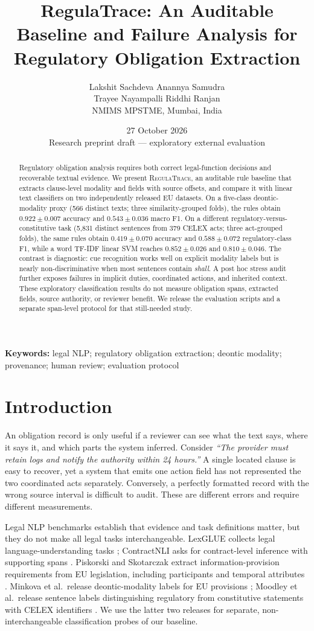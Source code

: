 \documentclass[11pt,a4paper]{article}
\title{\bfseries RegulaTrace: An Auditable Baseline and Failure Analysis for Regulatory Obligation Extraction}
\author{Lakshit Sachdeva \quad Anannya Samudra\\
Trayee Nayampalli \quad Riddhi Ranjan\\[0.35em]
\small NMIMS MPSTME, Mumbai, India}
\date{27 October 2026\\[0.25em]\small Research preprint draft --- exploratory external evaluation}
\newcommand{\system}{\textsc{RegulaTrace}}
\begin{document}
\maketitle
\begin{abstract}
Regulatory obligation analysis requires both correct legal-function decisions and recoverable textual evidence. We present \system, an auditable rule baseline that extracts clause-level modality and fields with source offsets, and compare it with linear text classifiers on two independently released EU datasets. On a five-class deontic-modality proxy (566 distinct texts; three similarity-grouped folds), the rules obtain $0.922\pm0.007$ accuracy and $0.543\pm0.036$ macro F1. On a different regulatory-versus-constitutive task (5,831 distinct sentences from 379 CELEX acts; three act-grouped folds), the same rules obtain $0.419\pm0.070$ accuracy and $0.588\pm0.072$ regulatory-class F1, while a word TF-IDF linear SVM reaches $0.852\pm0.026$ and $0.810\pm0.046$. The contrast is diagnostic: cue recognition works well on explicit modality labels but is nearly non-discriminative when most sentences contain \emph{shall}. A post hoc stress audit further exposes failures in implicit duties, coordinated actions, and inherited context. These exploratory classification results do not measure obligation spans, extracted fields, source authority, or reviewer benefit. We release the evaluation scripts and a separate span-level protocol for that still-needed study.
\end{abstract}
\noindent\textbf{Keywords:} legal NLP; regulatory obligation extraction; deontic modality; provenance; human review; evaluation protocol

\section{Introduction}
An obligation record is only useful if a reviewer can see what the text says, where it says it, and which parts the system inferred. Consider \emph{``The provider must retain logs and notify the authority within 24 hours.''} A single located clause is easy to recover, yet a system that emits one action field has not represented the two coordinated acts separately. Conversely, a perfectly formatted record with the wrong source interval is difficult to audit. These are different errors and require different measurements.

Legal NLP benchmarks establish that evidence and task definitions matter, but they do not make all legal tasks interchangeable. LexGLUE collects legal language-understanding tasks \cite{lexglue}; ContractNLI asks for contract-level inference with supporting spans \cite{contractnli}. Piskorski and Skotarczak extract information-provision requirements from EU legislation, including participants and temporal attributes \cite{piskorski2025}. Minkova et al.\ release deontic-modality labels for EU provisions \cite{minkova2023,minkovadata}; Moodley et al.\ release sentence labels distinguishing regulatory from constitutive statements with CELEX identifiers \cite{moodleydata}. We use the latter two releases for separate, non-interchangeable classification probes of our baseline.
\end{document}
